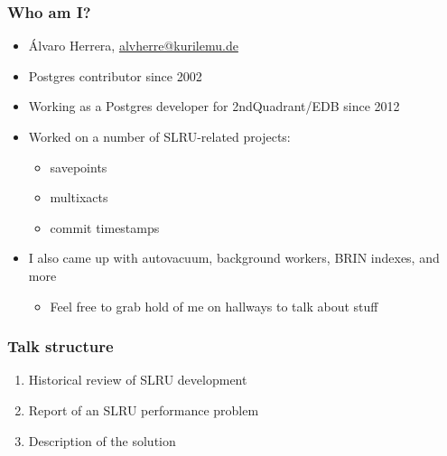 \newcommand{\linksize}{\scriptsize}


\begin{frame}[plain]
  \titlepage
\end{frame}

\begin{frame}
  \frametitle{Who am I?}
  \begin{itemize}
    \item Álvaro Herrera, \href{mailto:alvherre@kurilemu.de}{alvherre@kurilemu.de}
    \item Postgres contributor since 2002
    \item Working as a Postgres developer for 2ndQuadrant/EDB since 2012
    \item Worked on a number of SLRU-related projects:
      \begin{itemize}
	\item savepoints
	\item multixacts
	\item commit timestamps
      \end{itemize}
\item \linksize I also came up with autovacuum, background workers, BRIN indexes, and more
\begin{itemize} \item \linksize Feel free to grab hold of me on hallways to talk about stuff \end{itemize}
  \end{itemize}
\end{frame}

\begin{frame}
  \frametitle{Talk structure}
  \begin{enumerate}
    \item Historical review of SLRU development
    \item Report of an SLRU performance problem
    \item Description of the solution
  \end{enumerate}
\end{frame}


